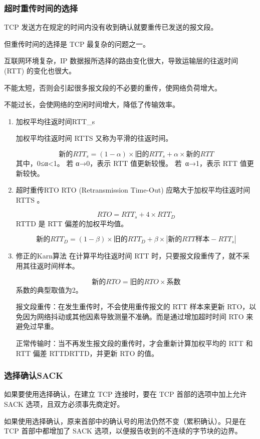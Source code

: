 \documentclass[11pt]{article}
\begin{document}
\subsubsection{超时重传时间的选择}
\label{sec:orgf9efdfa}
TCP 发送方在规定的时间内没有收到确认就要重传已发送的报文段。

但重传时间的选择是 TCP 最复杂的问题之一。

互联网环境复杂，IP 数据报所选择的路由变化很大，导致运输层的往返时间 (RTT) 的变化也很大。

不能太短，否则会引起很多报文段的不必要的重传，使网络负荷增大。

不能过长，会使网络的空闲时间增大，降低了传输效率。
\begin{enumerate}
\item 加权平均往返时间RTT\_s
\label{sec:org535423d}

加权平均往返时间 RTTS 又称为平滑的往返时间。

\[
  新的RTT_s = (1-\alpha) \times 旧的RTT_s + \alpha \times 新的RTT
\]
其中，0≤α<1。
若 α→0，表示 RTT 值更新较慢。
若 α→1，表示 RTT 值更新较快。
\item 超时重传RTO
\label{sec:orgde4a03a}
RTO (Retransmission Time-Out) 应略大于加权平均往返时间 RTTS 。

\[
  RTO=RTT_s + 4 \times RTT_D
\]
RTTD 是 RTT 偏差的加权平均值。

\[
  新的RTT_D=(1- \beta) \times 旧的RTT_D+ \beta \times |新的RTT样本-RTT_s|
\]
\item 修正的Karn算法
\label{sec:org6076d24}
在计算平均往返时间 RTT 时，只要报文段重传了，就不采用其往返时间样本。

\[
  新的RTO=旧的RTO \times 系数
\]
系数的典型取值为2。

报文段重传：在发生重传时，不会使用重传报文的 RTT 样本来更新 RTO，以免因为网络抖动或其他因素导致测量不准确。而是通过增加超时时间 RTO 来避免过早重。

正常传输时：当不再发生报文段的重传时，才会重新计算加权平均的 RTT 和 RTT 偏差 RTTDRTTD​，并更新 RTO 的值。
\end{enumerate}
\subsubsection{选择确认SACK}
\label{sec:org1d6380b}
如果要使用选择确认，在建立 TCP 连接时，要在 TCP 首部的选项中加上允许 SACK 选项，且双方必须事先商定好。

如果使用选择确认，原来首部中的确认号的用法仍然不变（累积确认）。只是在 TCP 首部中都增加了 SACK 选项，以便报告收到的不连续的字节块的边界。
\end{document}
